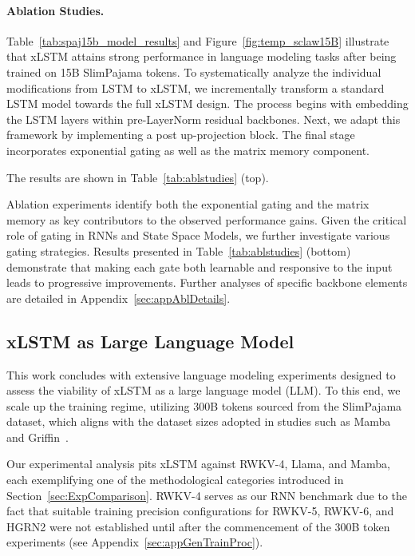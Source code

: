 \paragraph{Ablation Studies.}
Table~\ref{tab:spaj15b_model_results} and Figure~\ref{fig:temp_sclaw15B} illustrate that xLSTM attains strong performance in language modeling tasks after being trained on 15B SlimPajama tokens. To systematically analyze the individual modifications from LSTM to xLSTM, we incrementally transform a standard LSTM model towards the full xLSTM design. The process begins with embedding the LSTM layers within pre-LayerNorm residual backbones. Next, we adapt this framework by implementing a post up-projection block. The final stage incorporates exponential gating as well as the matrix memory component.

The results are shown in Table~\ref{tab:ablstudies} (top). 

Ablation experiments identify both the exponential gating and the matrix memory as key contributors to the observed performance gains. Given the critical role of gating in RNNs and State Space Models, we further investigate various gating strategies. Results presented in Table~\ref{tab:ablstudies} (bottom) demonstrate that making each gate both learnable and responsive to the input leads to progressive improvements. Further analyses of specific backbone elements are detailed in Appendix~\ref{sec:appAblDetails}.

\subsection{xLSTM as Large Language Model}
\label{sec:ExpLanguage}

This work concludes with extensive language modeling experiments designed to assess the viability of xLSTM as a large language model (LLM). To this end, we scale up the training regime, utilizing 300B tokens sourced from the SlimPajama dataset, which aligns with the dataset sizes adopted in studies such as Mamba~\citep{Gu:24arxiv} and Griffin~\citep{De:24arxiv}.

Our experimental analysis pits xLSTM against RWKV-4, Llama, and Mamba, each exemplifying one of the methodological categories introduced in Section~\ref{sec:ExpComparison}. RWKV-4 serves as our RNN benchmark due to the fact that suitable training precision configurations for RWKV-5, RWKV-6, and HGRN2 were not established until after the commencement of the 300B token experiments (see Appendix~\ref{sec:appGenTrainProc}).

